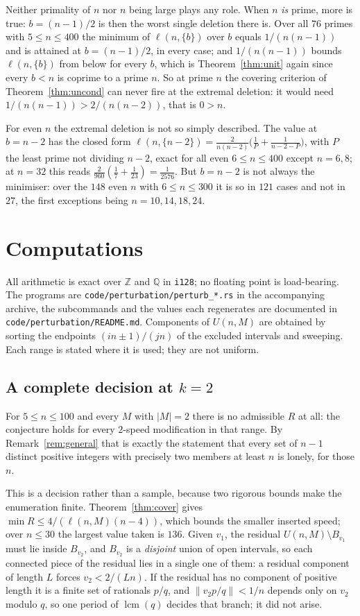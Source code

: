 \documentclass[11pt]{amsart}
\theoremstyle{plain}
\theoremstyle{definition}
\newcommand{\nrm}[1]{\left\lVert #1 \right\rVert}
\newcommand{\Z}{\mathbb{Z}}
\begin{document}
Neither primality of $n$ nor $n$ being large plays any role. When $n$ \emph{is} prime, more is true:
$b=(n-1)/2$ is then the worst single deletion there is. Over all $76$ primes with $5\le n\le400$ the
minimum of $\ell(n,\{b\})$ over $b$ equals $1/(n(n-1))$ and is attained at $b=(n-1)/2$, in every
case; and $1/(n(n-1))$ bounds $\ell(n,\{b\})$ from below for every $b$, which is
Theorem~\ref{thm:unit} again since every $b<n$ is coprime to a prime $n$. So at prime $n$ the
covering criterion of Theorem~\ref{thm:uncond} can never fire at the extremal deletion: it would
need $1/(n(n-1))>2/(n(n-2))$, that is $0>n$.

For even $n$ the extremal deletion is not so simply described. The value at $b=n-2$ has the closed
form $\ell(n,\{n-2\})=\frac{2}{n(n-2)}\bigl(\frac1P+\frac1{n-2-P}\bigr)$, with $P$ the least prime
not dividing $n-2$, exact for all even $6\le n\le400$ except $n=6,8$; at $n=32$ this reads
$\frac{2}{960}(\frac17+\frac1{23})=\frac1{2576}$. But $b=n-2$ is not always the minimiser: over the
$148$ even $n$ with $6\le n\le300$ it is so in $121$ cases and not in $27$, the first exceptions
being $n=10,14,18,24$.

\section{Computations}\label{sec:comp}

All arithmetic is exact over $\Z$ and $\mathbb{Q}$ in \texttt{i128}; no floating point is
load-bearing. The programs are \texttt{code/perturbation/perturb\_*.rs} in the accompanying archive,
the subcommands and the values each regenerates are documented in
\texttt{code/perturbation/README.md}. Components of $U(n,M)$ are obtained by sorting the endpoints
$(in\pm1)/(jn)$ of the excluded intervals and sweeping. Each range is stated where it is used; they
are not uniform.

\subsection*{A complete decision at \texorpdfstring{$k=2$}{k=2}}

For $5\le n\le100$ and every $M$ with $|M|=2$ there is no admissible $R$ at all: the conjecture holds
for every $2$-speed modification in that range. By Remark~\ref{rem:general} that is exactly the
statement that every set of $n-1$ distinct positive integers with precisely two members at least $n$
is lonely, for those $n$.

This is a decision rather than a sample, because two rigorous bounds make the enumeration finite.
Theorem~\ref{thm:cover} gives $\min R\le 4/(\ell(n,M)(n-4))$, which bounds the smaller inserted
speed; over $n\le30$ the largest value taken is $136$. Given $v_1$, the residual
$U(n,M)\setminus B_{v_1}$ must lie inside $B_{v_2}$, and $B_{v_2}$ is a \emph{disjoint} union of open
intervals, so each connected piece of the residual lies in a single one of them: a residual
component of length $L$ forces $v_2<2/(Ln)$. If the residual has no component of positive length it
is a finite set of rationals $p/q$, and $\nrm{v_2p/q}<1/n$ depends only on $v_2$ modulo $q$, so one
period of $\operatorname{lcm}(q)$ decides that branch; it did not arise.
\end{document}
